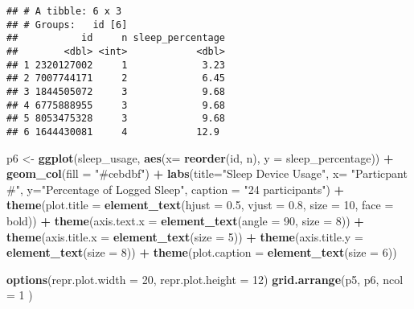 \documentclass[
]{article}
\newenvironment{Shaded}{\begin{snugshade}}{\end{snugshade}}
\newcommand{\AttributeTok}[1]{\textcolor[rgb]{0.13,0.29,0.53}{#1}}
\newcommand{\DecValTok}[1]{\textcolor[rgb]{0.00,0.00,0.81}{#1}}
\newcommand{\FloatTok}[1]{\textcolor[rgb]{0.00,0.00,0.81}{#1}}
\newcommand{\FunctionTok}[1]{\textcolor[rgb]{0.13,0.29,0.53}{\textbf{#1}}}
\newcommand{\NormalTok}[1]{#1}
\newcommand{\OtherTok}[1]{\textcolor[rgb]{0.56,0.35,0.01}{#1}}
\newcommand{\SpecialCharTok}[1]{\textcolor[rgb]{0.81,0.36,0.00}{\textbf{#1}}}
\newcommand{\StringTok}[1]{\textcolor[rgb]{0.31,0.60,0.02}{#1}}
\begin{document}
\begin{verbatim}
## # A tibble: 6 x 3
## # Groups:   id [6]
##           id     n sleep_percentage
##        <dbl> <int>            <dbl>
## 1 2320127002     1             3.23
## 2 7007744171     2             6.45
## 3 1844505072     3             9.68
## 4 6775888955     3             9.68
## 5 8053475328     3             9.68
## 6 1644430081     4            12.9
\end{verbatim}

\begin{Shaded}
\begin{Highlighting}[]
\NormalTok{p6 }\OtherTok{\textless{}{-}} \FunctionTok{ggplot}\NormalTok{(sleep\_usage, }\FunctionTok{aes}\NormalTok{(}\AttributeTok{x=} \FunctionTok{reorder}\NormalTok{(id, n), }\AttributeTok{y =}\NormalTok{ sleep\_percentage)) }\SpecialCharTok{+}
  \FunctionTok{geom\_col}\NormalTok{(}\AttributeTok{fill =} \StringTok{"\#cebdbf"}\NormalTok{) }\SpecialCharTok{+} 
  \FunctionTok{labs}\NormalTok{(}\AttributeTok{title=}\StringTok{"Sleep Device Usage"}\NormalTok{, }\AttributeTok{x=} \StringTok{"Particpant \#"}\NormalTok{, }\AttributeTok{y=}\StringTok{"Percentage of Logged Sleep"}\NormalTok{, }\AttributeTok{caption =} \StringTok{"24 participants"}\NormalTok{) }\SpecialCharTok{+}
  \FunctionTok{theme}\NormalTok{(}\AttributeTok{plot.title =} \FunctionTok{element\_text}\NormalTok{(}\AttributeTok{hjust =} \FloatTok{0.5}\NormalTok{, }\AttributeTok{vjust =} \FloatTok{0.8}\NormalTok{, }\AttributeTok{size =} \DecValTok{10}\NormalTok{, }\AttributeTok{face =} \StringTok{\textquotesingle{}bold\textquotesingle{}}\NormalTok{)) }\SpecialCharTok{+}
  \FunctionTok{theme}\NormalTok{(}\AttributeTok{axis.text.x =} \FunctionTok{element\_text}\NormalTok{(}\AttributeTok{angle =} \DecValTok{90}\NormalTok{, }\AttributeTok{size =} \DecValTok{8}\NormalTok{)) }\SpecialCharTok{+}
  \FunctionTok{theme}\NormalTok{(}\AttributeTok{axis.title.x =} \FunctionTok{element\_text}\NormalTok{(}\AttributeTok{size =} \DecValTok{5}\NormalTok{)) }\SpecialCharTok{+}
  \FunctionTok{theme}\NormalTok{(}\AttributeTok{axis.title.y =} \FunctionTok{element\_text}\NormalTok{(}\AttributeTok{size =} \DecValTok{8}\NormalTok{)) }\SpecialCharTok{+}
  \FunctionTok{theme}\NormalTok{(}\AttributeTok{plot.caption =} \FunctionTok{element\_text}\NormalTok{(}\AttributeTok{size =} \DecValTok{6}\NormalTok{))}

\FunctionTok{options}\NormalTok{(}\AttributeTok{repr.plot.width =} \DecValTok{20}\NormalTok{, }\AttributeTok{repr.plot.height =} \DecValTok{12}\NormalTok{)}
\FunctionTok{grid.arrange}\NormalTok{(p5, p6,}
             \AttributeTok{ncol =} \DecValTok{1}
\NormalTok{)}
\end{Highlighting}
\end{Shaded}
\end{document}
